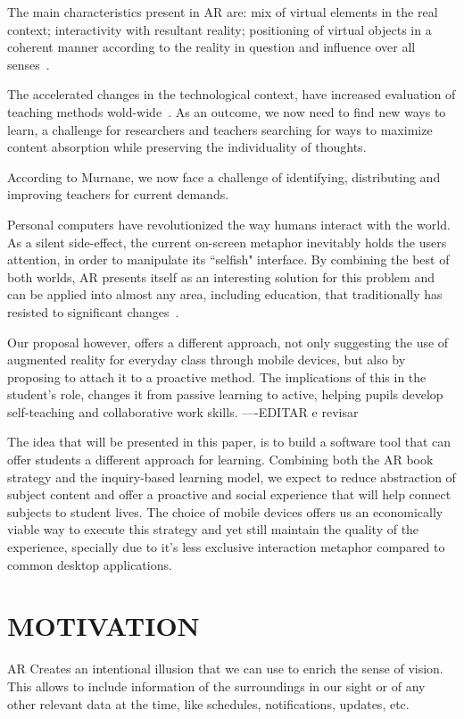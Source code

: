 \documentclass[a4paper,twoside]{article}
\begin{document}
The main characteristics present in AR are: mix of virtual elements in the real context; interactivity with resultant reality; positioning of virtual objects in a coherent manner according to the reality in question and influence over all senses~\cite{azuma2001recent}.

The accelerated changes in the technological context, have increased evaluation of teaching methods wold-wide~\cite{murnane2007problem}. As an outcome, we now need to find new ways to learn, a challenge for researchers and teachers searching for ways to maximize content absorption while preserving the individuality of thoughts.
	
According to Murnane, we now face a challenge of identifying, distributing and improving teachers for current demands.

Personal computers have revolutionized the way humans interact with the world. As a silent side-effect, the current on-screen metaphor inevitably holds the users attention, in order to manipulate its ``selfish" interface. By combining the best of both worlds, AR presents itself as an interesting solution for this problem and can be applied into almost any area, including education, that traditionally has resisted to significant changes~\cite{hannafin1993technology}.

Our proposal however, offers a different approach, not only suggesting the use of augmented reality for everyday class through mobile devices, but also by proposing to attach it to a proactive method. The implications of this in the student's role, changes it from passive learning to active, helping pupils develop self-teaching and collaborative work skills. ----EDITAR e revisar

The idea that will be presented in this paper, is to build a software tool that can offer students a different approach for learning. Combining both the AR book strategy and the inquiry-based learning model, we expect to reduce abstraction of subject content and offer a proactive and social experience that will help connect subjects to student lives. The choice of mobile devices offers us an economically viable way to execute this strategy and yet still maintain the quality of the experience, specially due to it's less exclusive interaction metaphor compared to common desktop applications.

\section{\uppercase{Motivation}}
\noindent AR Creates an intentional illusion that we can use to enrich the sense of vision. This allows to include information of the surroundings in our sight or of any other relevant data at the time, like schedules, notifications, updates, etc.  
\end{document}
